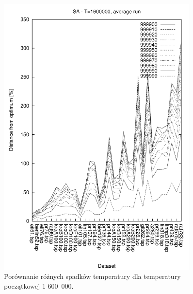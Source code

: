 \begin{figure}
\begin{center}
\includegraphics[width=0.9\textwidth]{wykresy/sa/sa_1600000_av}
\end{center}
\caption{Porównanie różnych spadków temperatury dla temperatury początkowej 1 600~000.}
\label{sa_1600000_av}
\end{figure}

